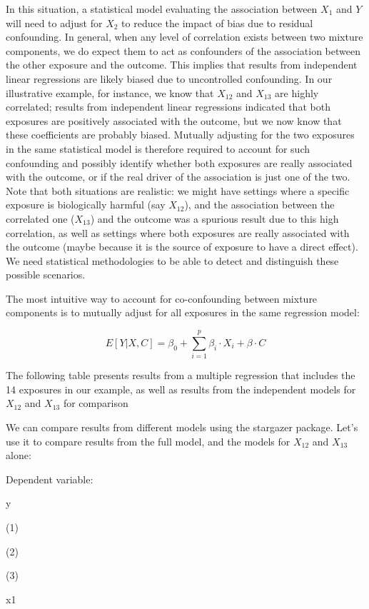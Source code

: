 \documentclass[
]{book}
\begin{document}
In this situation, a statistical model evaluating the association between \(X_1\) and \(Y\) will need to adjust for \(X_2\) to reduce the impact of bias due to residual confounding. In general, when any level of correlation exists between two mixture components, we do expect them to act as confounders of the association between the other exposure and the outcome. This implies that results from independent linear regressions are likely biased due to uncontrolled confounding. In our illustrative example, for instance, we know that \(X_{12}\) and \(X_{13}\) are highly correlated; results from independent linear regressions indicated that both exposures are positively associated with the outcome, but we now know that these coefficients are probably biased. Mutually adjusting for the two exposures in the same statistical model is therefore required to account for such confounding and possibly identify whether both exposures are really associated with the outcome, or if the real driver of the association is just one of the two. Note that both situations are realistic: we might have settings where a specific exposure is biologically harmful (say \(X_{12}\)), and the association between the correlated one (\(X_{13}\)) and the outcome was a spurious result due to this high correlation, as well as settings where both exposures are really associated with the outcome (maybe because it is the source of exposure to have a direct effect). We need statistical methodologies to be able to detect and distinguish these possible scenarios.

The most intuitive way to account for co-confounding between mixture components is to mutually adjust for all exposures in the same regression model:

\[E[Y|X,C]=\beta_0+\sum_{i=1}^p\beta_i \cdot X_i + \beta \cdot C\]

The following table presents results from a multiple regression that includes the 14 exposures in our example, as well as results from the independent models for \(X_{12}\) and \(X_{13}\) for comparison

We can compare results from different models using the stargazer package. Let's use it to compare results from the full model, and the models for \(X_{12}\) and \(X_{13}\) alone:

Dependent variable:

y

(1)

(2)

(3)

x1
\end{document}
